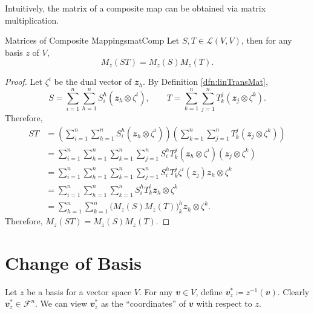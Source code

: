 \documentclass[math, code]{amznotes}
\theoremstyle{remark}
\begin{document}
Intuitively, the matrix of a composite map can be obtained via matrix multiplication.
\begin{probox}{Matrices of Composite Mappings}{matComp}
    Let $S, T \in \mathcal{L}(V, V)$, then for any basis $z$ of $V$, 
    \begin{equation*}
        M_z(ST) = M_z(S)M_z(T).
    \end{equation*}
    \tcblower
    \begin{proof}
        Let $\zeta^i$ be the dual vector of $\mathbfit{z}_h$. By Definition \ref{dfn:linTransMat}, 
        \begin{equation*}
            S = \sum_{i = 1}^{n}\sum_{h = 1}^{n}S^h_i(\mathbfit{z}_h \otimes \zeta^i), \qquad T = \sum_{k = 1}^{n}\sum_{j = 1}^{n}T^j_k(\mathbfit{z}_j \otimes \zeta^k).
        \end{equation*}
        Therefore,
        \begin{align*}
            ST & = \left(\sum_{i = 1}^{n}\sum_{h = 1}^{n}S^h_i(\mathbfit{z}_h \otimes \zeta^i)\right)\left(\sum_{k = 1}^{n}\sum_{j = 1}^{n}T^j_k(\mathbfit{z}_j \otimes \zeta^k)\right) \\
            & = \sum_{i = 1}^{n}\sum_{h = 1}^{n}\sum_{k = 1}^{n}\sum_{j = 1}^{n}S^h_iT^j_k(\mathbfit{z}_h \otimes \zeta^i)(\mathbfit{z}_j \otimes \zeta^k) \\
            & = \sum_{i = 1}^{n}\sum_{h = 1}^{n}\sum_{k = 1}^{n}\sum_{j = 1}^{n}S^h_iT^j_k\zeta^i(\mathbfit{z}_j)\mathbfit{z}_h \otimes \zeta^k \\
            & = \sum_{i = 1}^{n}\sum_{h = 1}^{n}\sum_{k = 1}^{n}S^h_iT^i_k\mathbfit{z}_h \otimes \zeta^k \\
            & = \sum_{h = 1}^{n}\sum_{k = 1}^{n}\bigl(M_z(S)M_z(T)\bigr)^h_k\mathbfit{z}_h \otimes \zeta^k.
        \end{align*}
        Therefore, $M_z(ST) = M_z(S)M_z(T)$.
    \end{proof}
\end{probox}
\section{Change of Basis}
Let $z$ be a basis for a vector space $V$. For any $\mathbfit{v} \in V$, define $\mathbfit{v}^*_z \coloneqq z^{-1}(\mathbfit{v})$. Clearly $\mathbfit{v}^*_z \in \mathcal{F}^n$. We can view $\mathbfit{v}^*_z$ as the ``coordinates'' of $\mathbfit{v}$ with respect to $z$.
\end{document}
